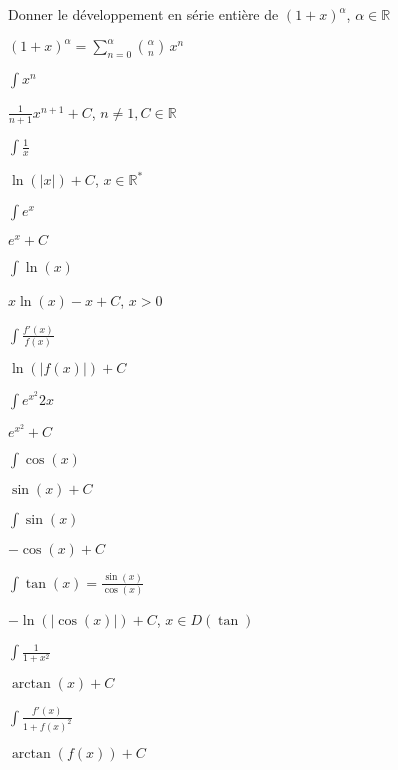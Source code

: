\documentclass[12pt]{article}
\newcommand*{\xfield}[1]{\begin{mdframed}\centering #1\end{mdframed}\bigskip}
\newenvironment{note}{}{}
\begin{document}
\begin{note}
	\xfield{Donner le développement en série entière de $(1+x)^\alpha$, $\alpha \in \mathbb{R}$}
	\xfield{$(1+x)^\alpha = \sum\limits_{n=0}^{\alpha}{{\alpha \choose n}\, x^n}$}
\end{note}

\begin{note}
	\xfield{$\int x^n$}
	\xfield{$\frac{1}{n+1}x^{n+1} + C$, $n\neq 1, C\in \mathbb{R}$}
\end{note}

\begin{note}
	\xfield{$\int \frac{1}{x}$}
	\xfield{$\ln(\vert x\vert ) + C$, $x \in \mathbb{R}^*$}
\end{note}

\begin{note}
	\xfield{$\int e^x$}
	\xfield{$e^x + C$}
\end{note}

\begin{note}
	\xfield{$\int \ln(x)$}
	\xfield{$x\ln(x)-x+C$, $x>0$}
\end{note}

\begin{note}
	\xfield{$\int \frac{f'(x)}{f(x)}$}
	\xfield{$\ln(\vert f(x) \vert ) +C$}
\end{note}

\begin{note}
	\xfield{$\int e^{x^2}2x$}
	\xfield{$e^{x^2}+C$}
\end{note}

\begin{note}
	\xfield{$\int \cos(x)$}
	\xfield{$\sin(x) +C$}
\end{note}

\begin{note}
	\xfield{$\int \sin(x)$}
	\xfield{$-\cos(x) +C$}
\end{note}

\begin{note}
	\xfield{$\int \tan(x) = \frac{\sin(x)}{\cos(x)}$}
	\xfield{$-\ln(\vert \cos(x) \vert ) + C$, $x \in D(\tan)$}
\end{note}

\begin{note}
	\xfield{$\int \frac{1}{1+x^2}$}
	\xfield{$\arctan(x) + C$}
\end{note}

\begin{note}
	\xfield{$\int \frac{f'(x)}{1+f(x)^2}$}
	\xfield{$\arctan(f(x)) +C$}
\end{note}
\end{document}
